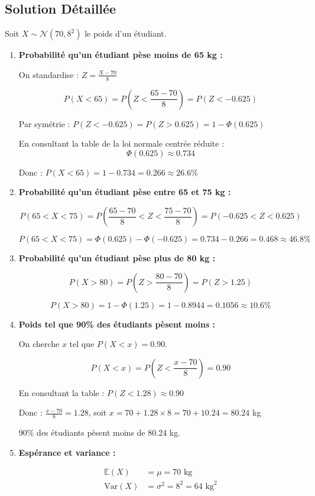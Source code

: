 \documentclass[11pt,a4paper]{article}
\newcommand{\Var}{\text{Var}}
\newcommand{\E}{\mathbb{E}}
\begin{document}
\subsection{Solution Détaillée}

Soit $X \sim \mathcal{N}(70, 8^2)$ le poids d'un étudiant.

\begin{enumerate}
    \item \textbf{Probabilité qu'un étudiant pèse moins de 65 kg :}
    
    On standardise : $Z = \frac{X - 70}{8}$
    
    $$P(X < 65) = P\left(Z < \frac{65 - 70}{8}\right) = P(Z < -0.625)$$
    
    Par symétrie : $P(Z < -0.625) = P(Z > 0.625) = 1 - \Phi(0.625)$
    
    En consultant la table de la loi normale centrée réduite :
    $$\Phi(0.625) \approx 0.734$$
    
    Donc : $P(X < 65) = 1 - 0.734 = 0.266 \approx 26.6\%$
    
    \item \textbf{Probabilité qu'un étudiant pèse entre 65 et 75 kg :}
    
    $$P(65 < X < 75) = P\left(\frac{65 - 70}{8} < Z < \frac{75 - 70}{8}\right) = P(-0.625 < Z < 0.625)$$
    
    $$P(65 < X < 75) = \Phi(0.625) - \Phi(-0.625) = 0.734 - 0.266 = 0.468 \approx 46.8\%$$
    
    \item \textbf{Probabilité qu'un étudiant pèse plus de 80 kg :}
    
    $$P(X > 80) = P\left(Z > \frac{80 - 70}{8}\right) = P(Z > 1.25)$$
    
    $$P(X > 80) = 1 - \Phi(1.25) = 1 - 0.8944 = 0.1056 \approx 10.6\%$$
    
    \item \textbf{Poids tel que 90\% des étudiants pèsent moins :}
    
    On cherche $x$ tel que $P(X < x) = 0.90$.
    
    $$P(X < x) = P\left(Z < \frac{x - 70}{8}\right) = 0.90$$
    
    En consultant la table : $P(Z < 1.28) \approx 0.90$
    
    Donc : $\frac{x - 70}{8} = 1.28$, soit $x = 70 + 1.28 \times 8 = 70 + 10.24 = 80.24$ kg
    
    90\% des étudiants pèsent moins de 80.24 kg.
    
    \item \textbf{Espérance et variance :}
    
    \begin{align}
    \E(X) &= \mu = 70 \text{ kg} \\
    \Var(X) &= \sigma^2 = 8^2 = 64 \text{ kg}^2
    \end{align}
\end{enumerate}
\end{document}
